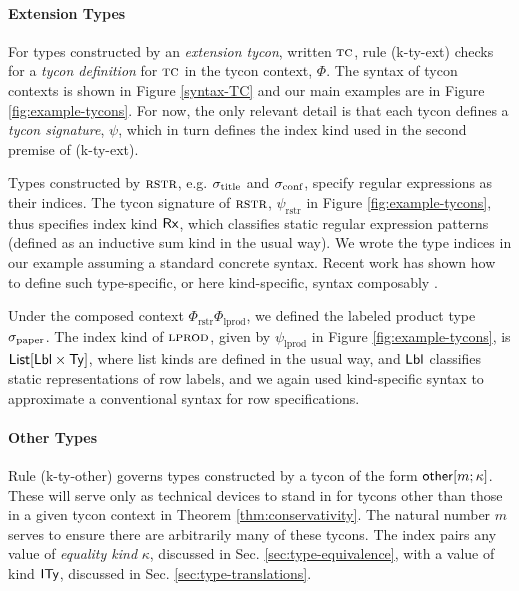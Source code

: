 \documentclass[pldi]{sigplanconf-pldi15}
\begin{document}
\paragraph{Extension Types} 

For types constructed by an \emph{extension tycon}, written $\textsc{tc}$, rule (k-ty-ext) checks for a \emph{tycon definition} for $\textsc{tc}$ in the tycon context, $\Phi$. The syntax of tycon contexts is shown in Figure \ref{syntax-TC} and our main examples are in Figure \ref{fig:example-tycons}. For now, the only relevant detail is that each tycon defines a \emph{tycon signature}, $\psi$, which in turn defines the index kind used in the second premise of (k-ty-ext).

Types constructed by $\textsc{rstr}$, e.g. $\sigma_\text{title}$ and $\sigma_\text{conf}$, specify regular expressions as their indices.  The tycon signature of $\textsc{rstr}$, $\psi_\text{rstr}$ in Figure \ref{fig:example-tycons}, thus specifies index kind ${\sf Rx}$, which classifies static regular expression patterns (defined as an inductive sum kind in the usual way). We wrote the type indices in our example assuming a standard concrete syntax. Recent work has shown how to define such type-specific, or here kind-specific, syntax composably \cite{TSLs}. %

Under the composed context $\Phi_\text{rstr}\Phi_\text{lprod}$, we defined the labeled product type $\sigma_\text{paper}$. The index kind of $\textsc{lprod}$, given by $\psi_\text{lprod}$ in Figure \ref{fig:example-tycons}, is ${\sf List}[{\sf Lbl} \times {\sf Ty}]$, where list kinds are defined in the usual way, and ${\sf Lbl}$ classifies static representations of row labels, and  
we again used kind-specific syntax to approximate a conventional syntax for row specifications. 

\paragraph{Other Types}
Rule (k-ty-other) governs types constructed by a tycon of the form ${\sf other}[m; \kappa]$. These will serve only as technical devices to stand in for tycons other than those in a given tycon context in Theorem \ref{thm:conservativity}. The natural number $m$ serves to ensure there are arbitrarily many of these tycons. The index pairs any value of \emph{equality kind} $\kappa$, discussed in Sec. \ref{sec:type-equivalence}, with a value of kind ${\sf ITy}$, discussed in Sec. \ref{sec:type-translations}.%
\end{document}
